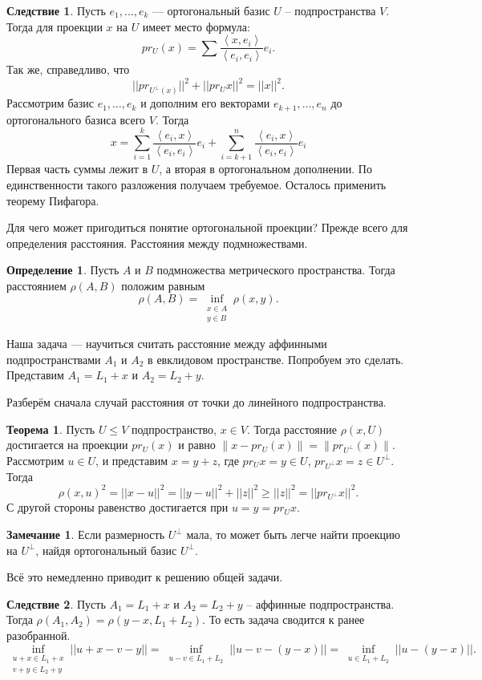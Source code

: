 \documentclass[10pt,a4paper,oneside]{book} %
\theoremstyle{definition}
\newtheorem*{rem}{Замечание}
\newtheorem*{defn}{Определение}
\newtheorem{thm}{Теорема}
\newtheorem{cor}{Следствие}
\def\lan{\left\langle }
\def\ran{\right\rangle}
\def\thrm{\begin{thm}}
\def\ethrm{\end{thm}}
\def\dfn{\begin{defn}}
\def\edfn{\end{defn}}
\def\crl{\begin{cor}}
\def\ecrl{\end{cor}}
\def\rm{\begin{rem}}
\def\erm{\end{rem}}
\begin{document}
\crl Пусть $ e_1,\dots, e_k$ --- ортогональный базис $U$ -- подпространства $V$. Тогда для проекции $x$ на $U$ имеет место формула:
$$ pr_U(x)= \sum \frac{\lan x,e_i\ran}{\lan e_i,e_i\ran} e_i.$$
Так же, справедливо, что
$$||pr_{U^{\bot}(x)}||^2 + ||pr_U x||^2=||x||^2.$$
\proof Рассмотрим базис $e_1,\dots, e_k$ и дополним его векторами $e_{k+1},\dots,e_n$ до ортогонального базиса всего $V$. Тогда $$x= \sum_{i=1}^k \frac{\lan e_i,  x\ran}{\lan e_i, e_i\ran}e_i + \sum_{i=k+1}^n \frac{\lan e_i,  x\ran}{\lan e_i, e_i\ran}e_i $$
Первая часть суммы лежит в $U$, а вторая в ортогональном дополнении. По единственности такого разложения получаем требуемое. Осталось применить теорему Пифагора.
\endproof
\ecrl







Для чего может пригодиться понятие ортогональной проекции? Прежде всего для определения расстояния. Расстояния между подмножествами.

\dfn Пусть $A$ и $B$ подмножества метрического пространства. Тогда расстоянием $\rho(A,B)$ положим равным
$$\rho(A,B)=\inf_{\substack{x\in A\\ y \in B}} \rho(x,y).$$
\edfn

Наша задача --- научиться считать расстояние между аффинными подпространствами $A_1$ и $A_2$ в евклидовом пространстве. Попробуем это сделать. Представим $A_1=L_1+x$ и $A_2=L_2+y$. 

Разберём сначала случай расстояния от точки до линейного подпространства. 

\thrm Пусть $U \leq V$ подпространство, $x \in V$. Тогда расстояние $\rho(x,U)$ достигается на проекции  $pr_U(x)$ и равно $\|x-pr_U(x)\|=\|pr_{U^{\bot}}(x)\|$.
\proof Рассмотрим $u \in U$, и представим $x=y+z$, где $pr_Ux=y \in U$, $pr_{U^{\bot}}x =z \in U^{\bot}$. Тогда $$\rho(x,u)^2= ||x-u||^2= ||y - u ||^2+ ||z||^2 \geq ||z||^2=||pr_{U^{\bot}}x||^2 .$$
С другой стороны равенство достигается при $u=y=pr_{U} x$.
\endproof
\ethrm



\rm Если размерность $U^{\bot}$ мала, то может быть легче найти проекцию на $U^{\bot}$, найдя ортогональный базис $U^{\bot}$.
\erm

Всё это немедленно приводит к решению общей задачи.

\crl Пусть  $A_1=L_1+x$ и $A_2=L_2+y$ -- аффинные подпространства. Тогда $\rho(A_1,A_2)=\rho(y-x, L_1+L_2)$. То есть задача сводится к ранее разобранной.
\proof $$\inf_{\substack{u+x\in L_1+x\\ v+y \in L_2+y}} ||u+x-v-y||=\inf_{\substack{u-v\in L_1+ L_2}}||u-v - (y-x)||=\inf_{\substack{u\in L_1+ L_2}}||u- (y-x)||.$$
\endproof
\ecrl
\end{document}

